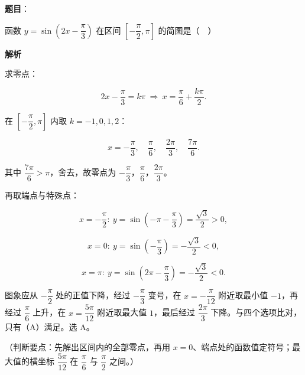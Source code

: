 \begin{answer}

\textbf{题目}：

函数 $y=\sin\left(2x-\dfrac{\pi}{3}\right)$ 在区间 $\left[-\dfrac{\pi}{2},\pi\right]$ 的简图是（　）
\nopagebreak[4]
\begin{center}\end{center}
\nopagebreak[4]
\textbf{解析}

求零点：

\nopagebreak[4]
\[2x-\frac{\pi}{3}=k\pi\ \Rightarrow\ x=\frac{\pi}{6}+\frac{k\pi}{2}.\]

在 $\left[-\dfrac{\pi}{2},\pi\right]$ 内取 $k=-1,0,1,2$：

\nopagebreak[4]
\[x=-\frac{\pi}{3},\quad \frac{\pi}{6},\quad \frac{2\pi}{3},\quad \frac{7\pi}{6}.\]

其中 $\dfrac{7\pi}{6}>\pi$，舍去，故零点为 $-\dfrac{\pi}{3}$，$\dfrac{\pi}{6}$，$\dfrac{2\pi}{3}$。

再取端点与特殊点：

\nopagebreak[4]
\[x=-\frac{\pi}{2}:\ y=\sin\left(-\pi-\frac{\pi}{3}\right)=\frac{\sqrt3}{2}>0,\]

\nopagebreak[4]
\[x=0:\ y=\sin\left(-\frac{\pi}{3}\right)=-\frac{\sqrt3}{2}<0,\]

\nopagebreak[4]
\[x=\pi:\ y=\sin\left(2\pi-\frac{\pi}{3}\right)=-\frac{\sqrt3}{2}<0.\]

图象应从 $-\dfrac{\pi}{2}$ 处的正值下降，经过 $-\dfrac{\pi}{3}$ 变号，在 $x=-\dfrac{\pi}{12}$ 附近取最小值 $-1$，再经过 $\dfrac{\pi}{6}$ 上升，在 $x=\dfrac{5\pi}{12}$ 附近取最大值 $1$，最后经过 $\dfrac{2\pi}{3}$ 下降。与四个选项比对，只有（A）满足。选 A。

（判断要点：先解出区间内的全部零点，再用 $x=0$、端点处的函数值定符号；最大值的横坐标 $\dfrac{5\pi}{12}$ 在 $\dfrac{\pi}{6}$ 与 $\dfrac{\pi}{2}$ 之间。）


\end{answer}
